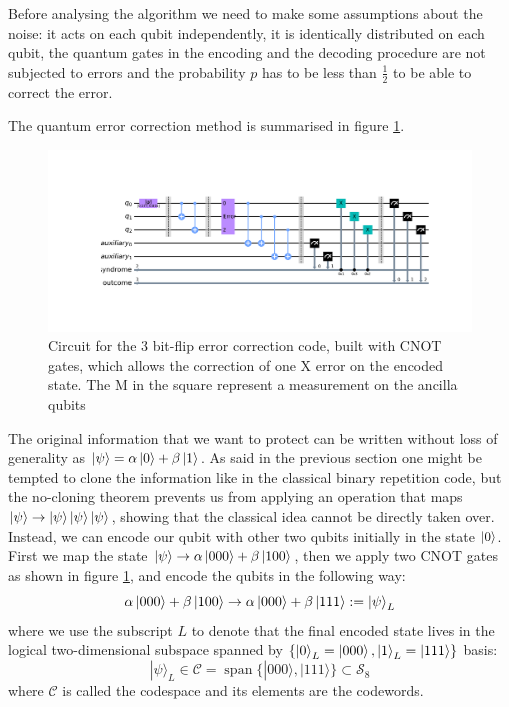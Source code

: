 Before analysing the algorithm we need to make some assumptions about the noise: it acts on each qubit independently, it is identically distributed on each qubit, the quantum gates in the encoding and the decoding procedure are not subjected to errors and the probability $p$ has to be less than $\frac{1}{2}$ to be able to correct the error.



The quantum error correction method is summarised in figure \ref{fig:3fq}.
\begin{figure}[h!]
    \centering
    \includegraphics[width=\textwidth]{Mainmatter/images/3bitflipcode.png}
    \caption{Circuit for the 3 bit-flip error correction code, built with CNOT gates, which allows the correction of one X error on the encoded state. The M in the square represent a measurement on the ancilla qubits}
    \label{fig:3fq}
\end{figure}

The original information that we want to protect can be written without loss of generality as $\ket{\psi} = \alpha\ket{0}+\beta\ket{1}$.
As said in the previous section one might be tempted to clone the information like in the classical binary repetition code, but the no-cloning theorem prevents us from applying an operation that maps $\ket{\psi} \to \ket{\psi}\ket{\psi}\ket{\psi}$, showing that the classical idea cannot be directly taken over.
Instead, we can encode our qubit with other two qubits initially in the state $\ket{0}$. First we map the state $\ket{\psi} \to  \alpha\ket{000}+\beta\ket{100}$, then we apply two CNOT gates as shown in figure \ref{fig:3fq}, and encode the qubits in the following way: 
\begin{equation*}
  \alpha\ket{000}+\beta\ket{100} \to \alpha\ket{000}+\beta\ket{111} := \ket{\psi}_L
\end{equation*}
where we use the subscript $L$ to denote that the final encoded state lives in the logical two-dimensional subspace spanned by $\{\ket{0}_L = \ket{000} , \ket{1}_L = \ket{111}\}$ basis:
$$
|\psi\rangle_{L} \in \mathcal{C}=\operatorname{span}\{|000\rangle,|111\rangle\} \subset \mathcal{S}_{8}
$$
where $\mathcal{C}$ is called the codespace and its elements are the codewords.%



